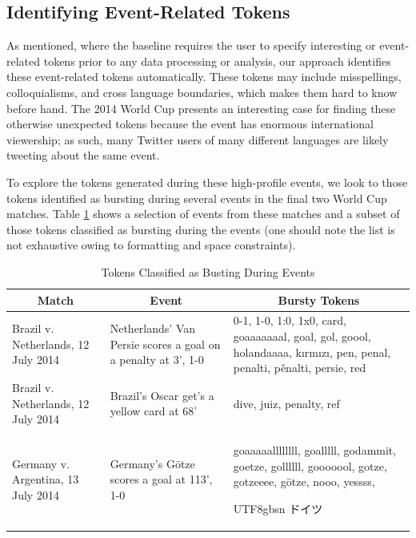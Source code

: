 \documentclass{sig-alternate}
\newcommand{\myfont}{gbsn}
\begin{document}
\subsection{Identifying Event-Related Tokens}

As mentioned, where the baseline requires the user to specify interesting or event-related tokens prior to any data processing or analysis, our approach identifies these event-related tokens automatically.
These tokens may include misspellings, colloquialisms, and cross language boundaries, which makes them hard to know before hand.
The 2014 World Cup presents an interesting case for finding these otherwise unexpected tokens because the event has enormous international viewership; as such, many Twitter users of many different languages are likely tweeting about the same event.

To explore the tokens generated during these high-profile events, we look to those tokens identified as bursting during several events in the final two World Cup matches.
Table \ref{tab:burstyTokens} shows a selection of events from these matches and a subset of those tokens classified as bursting during the events (one should note the list is not exhaustive owing to formatting and space constraints).

\begin{table}[htdp]
\caption{Tokens Classified as Busting During Events}
\begin{center}
\begin{tabular}{|p{0.75in}|p{0.7in}| p{1.45in} |}
\hline
\multicolumn{1}{|c|}{\textbf{Match}} & \multicolumn{1}{|c|}{\textbf{Event}} & \multicolumn{1}{|c|}{\textbf{Bursty Tokens}} \\ \hline
Brazil v. Netherlands, 12 July 2014 & Netherlands' Van Persie scores a goal on a penalty at 3', 1-0 & 0-1, 1-0, 1:0, 1x0, card, goaaaaaaal, goal, gol, goool, holandaaaa, k\i{}rm\i{}z\i{}, pen, penal, penalti, p\^{e}nalti, persie, red \\ \hline
Brazil v. Netherlands, 12 July 2014 & Brazil's Oscar get's a yellow card at 68' & dive, juiz, penalty, ref \\ \hline
Germany v. Argentina, 13 July 2014 & Germany's G\"{o}tze scores a goal at 113', 1-0 & goaaaaallllllll, goalllll, godammit, goetze, gollllll, gooooool, gotze, gotzeeee, g\"{o}tze, nooo, yessss, \begin{CJK}{UTF8}{\myfont} ドイツ\end{CJK} \\ \hline
\end{tabular}
\end{center}
\label{tab:burstyTokens}
\end{table}
\end{document}
